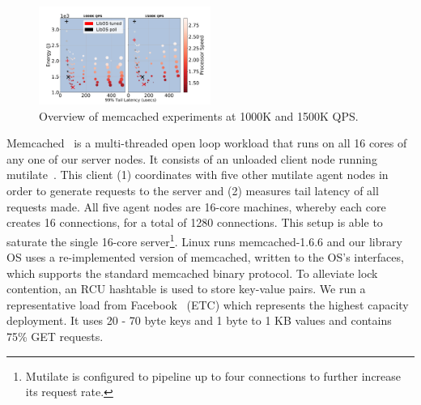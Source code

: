 \begin{figure}
\includegraphics[width=0.5\textwidth]{figures/mcd_overview2}
\vspace*{-8mm}
\caption[]{Overview of memcached experiments at 1000K and 1500K QPS.}
\label{fig:mcd_overview2}
\end{figure}





Memcached~\cite{mcd} is a multi-threaded open loop workload that runs on all 16 cores of any one of our server nodes. It consists of an unloaded client node running mutilate~\cite{mutilate}. This client (1) coordinates with five other mutilate agent nodes in order to generate requests to the server and (2) measures tail latency of all requests made. All five agent nodes are 16-core machines, whereby each core creates 16 connections, for a total of 1280 connections. This setup is able to saturate the single 16-core server\footnote{Mutilate is configured to pipeline up to four connections to further increase its request rate.}. Linux runs memcached-1.6.6 and our library OS uses a re-implemented version of memcached, written to the OS's interfaces, which supports the standard memcached binary protocol. To alleviate lock contention, an RCU hashtable is used to store key-value pairs. We run a representative load from Facebook~\cite{workloadanalysisfacebook} (ETC) which represents the highest capacity deployment. It uses 20 - 70 byte keys and 1 byte to 1 KB values and contains 75\% GET requests.

